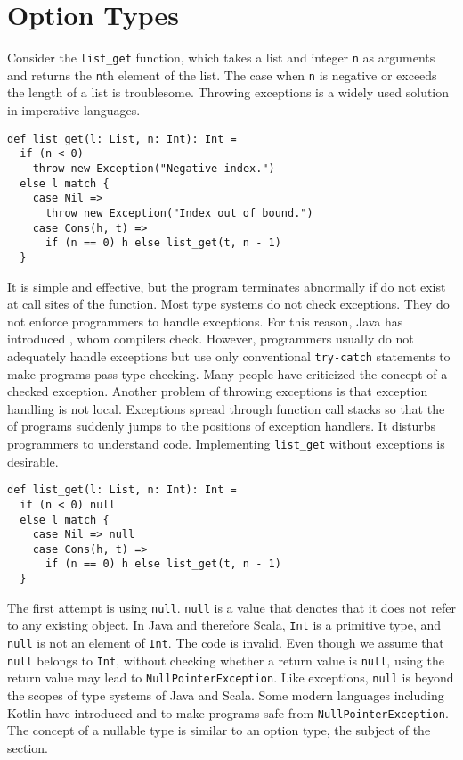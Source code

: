\section{Option Types}

Consider the \verb!list_get! function, which takes a list and integer \verb!n! as
arguments and returns the \verb!n!th element of the list. The case when \verb!n!
is negative or exceeds the length of a list is troublesome. Throwing exceptions
is a widely used solution in imperative languages.

\begin{verbatim}
def list_get(l: List, n: Int): Int =
  if (n < 0)
    throw new Exception("Negative index.")
  else l match {
    case Nil =>
      throw new Exception("Index out of bound.")
    case Cons(h, t) =>
      if (n == 0) h else list_get(t, n - 1)
  }
\end{verbatim}

It is simple and effective, but the program terminates abnormally if
 do not exist at call sites of the function. Most type
systems do not check exceptions. They do not enforce programmers to handle
exceptions. For this reason, Java has introduced , whom
compilers check. However, programmers usually do not adequately handle exceptions
but use only conventional \verb!try-catch! statements to make programs pass type
checking. Many people have criticized the concept of a checked exception. Another
problem of throwing exceptions is that exception handling is not local.
Exceptions spread through function call stacks so that the  of
programs suddenly jumps to the positions of exception handlers. It disturbs
programmers to understand code. Implementing \verb!list_get! without exceptions
is desirable.

\begin{verbatim}
def list_get(l: List, n: Int): Int =
  if (n < 0) null
  else l match {
    case Nil => null
    case Cons(h, t) =>
      if (n == 0) h else list_get(t, n - 1)
  }
\end{verbatim}

The first attempt is using \verb!null!. \verb!null! is a value that denotes that
it does not refer to any existing object. In Java and therefore Scala, \verb!Int!
is a primitive type, and \verb!null! is not an element of \verb!Int!. The code is
invalid. Even though we assume that \verb!null! belongs to \verb!Int!, without
checking whether a return value is \verb!null!, using the return value may lead
to \verb!NullPointerException!. Like exceptions, \verb!null! is beyond the scopes
of type systems of Java and Scala. Some modern languages including Kotlin have
introduced  and  to make programs safe
from \verb!NullPointerException!. The concept of a nullable type is similar to an
option type, the subject of the section.

